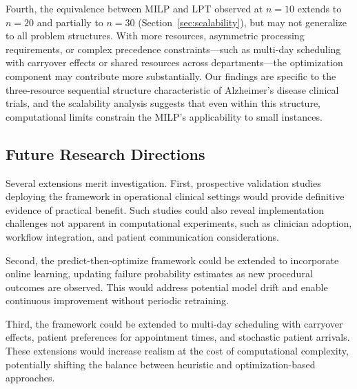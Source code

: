 \documentclass[11pt,a4paper]{article}
\begin{document}
Fourth, the equivalence between MILP and LPT observed at $n = 10$ extends to $n = 20$ and partially to $n = 30$ (Section~\ref{sec:scalability}), but may not generalize to all problem structures. With more resources, asymmetric processing requirements, or complex precedence constraints---such as multi-day scheduling with carryover effects or shared resources across departments---the optimization component may contribute more substantially. Our findings are specific to the three-resource sequential structure characteristic of Alzheimer's disease clinical trials, and the scalability analysis suggests that even within this structure, computational limits constrain the MILP's applicability to small instances.

\subsection{Future Research Directions}

Several extensions merit investigation. First, prospective validation studies deploying the framework in operational clinical settings would provide definitive evidence of practical benefit. Such studies could also reveal implementation challenges not apparent in computational experiments, such as clinician adoption, workflow integration, and patient communication considerations.

Second, the predict-then-optimize framework could be extended to incorporate online learning, updating failure probability estimates as new procedural outcomes are observed. This would address potential model drift and enable continuous improvement without periodic retraining.

Third, the framework could be extended to multi-day scheduling with carryover effects, patient preferences for appointment times, and stochastic patient arrivals. These extensions would increase realism at the cost of computational complexity, potentially shifting the balance between heuristic and optimization-based approaches.
\end{document}
